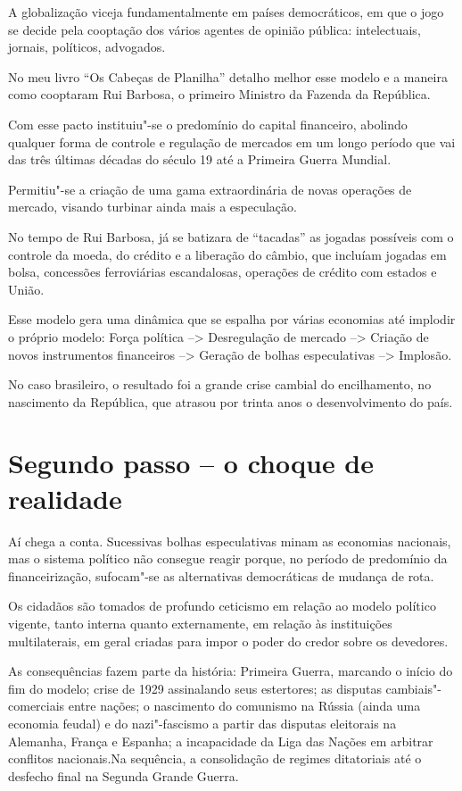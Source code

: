 A globalização viceja fundamentalmente em países democráticos, em que o
jogo se decide pela cooptação dos vários agentes de opinião pública:
intelectuais, jornais, políticos, advogados.

No meu livro ``Os Cabeças de Planilha'' detalho melhor esse modelo e a
maneira como cooptaram Rui Barbosa, o primeiro Ministro da Fazenda da
República.

Com esse pacto instituiu"-se o predomínio do capital financeiro, abolindo
qualquer forma de controle e regulação de mercados em um longo período
que vai das três últimas décadas do século 19 até a Primeira Guerra
Mundial.

Permitiu"-se a criação de uma gama extraordinária de novas operações de
mercado, visando turbinar ainda mais a especulação.

No tempo de Rui Barbosa, já se batizara de ``tacadas'' as jogadas
possíveis com o controle da moeda, do crédito e a liberação do câmbio,
que incluíam jogadas em bolsa, concessões ferroviárias escandalosas,
operações de crédito com estados e União.

Esse modelo gera uma dinâmica que se espalha por várias economias até
implodir o próprio modelo: Força política --\textgreater{} Desregulação
de mercado --\textgreater{} Criação de novos instrumentos financeiros
--\textgreater{} Geração de bolhas especulativas --\textgreater{}
Implosão.

No caso brasileiro, o resultado foi a grande crise cambial do
encilhamento, no nascimento da República, que atrasou por trinta anos o
desenvolvimento do país.

\section{Segundo passo -- o choque de realidade}

Aí chega a conta. Sucessivas bolhas especulativas minam as economias
nacionais, mas o sistema político não consegue reagir porque, no período
de predomínio da financeirização, sufocam"-se as alternativas
democráticas de mudança de rota.

Os cidadãos são tomados de profundo ceticismo em relação ao modelo
político vigente, tanto interna quanto externamente, em relação às
instituições multilaterais, em geral criadas para impor o poder do
credor sobre os devedores.

As consequências fazem parte da história: Primeira Guerra, marcando o
início do fim do modelo; crise de 1929 assinalando seus estertores; as
disputas cambiais"-comerciais entre nações; o nascimento do comunismo na
Rússia (ainda uma economia feudal) e do nazi"-fascismo a partir das
disputas eleitorais na Alemanha, França e Espanha; a incapacidade da
Liga das Nações em arbitrar conflitos nacionais.Na sequência, a
consolidação de regimes ditatoriais até o desfecho final na Segunda
Grande Guerra.

